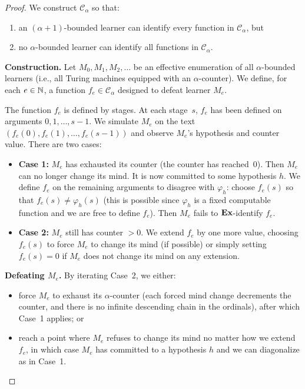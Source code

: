 \begin{proof}
We construct $\mathcal{C}_\alpha$ so that:
\begin{enumerate}[label=(\roman*)]
\item an $(\alpha+1)$-bounded learner can identify every function
  in $\mathcal{C}_\alpha$, but
\item no $\alpha$-bounded learner can identify all functions in
  $\mathcal{C}_\alpha$.
\end{enumerate}

\textbf{Construction.}
Let $M_0, M_1, M_2, \ldots$ be an effective enumeration of all
$\alpha$-bounded learners (i.e., all Turing machines equipped with
an $\alpha$-counter).  We define, for each $e \in \mathbb{N}$, a function
$f_e \in \mathcal{C}_\alpha$ designed to defeat learner $M_e$.

The function $f_e$ is defined by stages.  At each stage~$s$, $f_e$ has
been defined on arguments $0, 1, \ldots, s-1$.  We simulate $M_e$ on
the text $(f_e(0), f_e(1), \ldots, f_e(s-1))$ and observe $M_e$'s
hypothesis and counter value.  There are two cases:

\begin{itemize}[leftmargin=*]
\item \textbf{Case 1:} $M_e$ has exhausted its counter (the counter has
  reached~$0$).  Then $M_e$ can no longer change its mind.  It is now
  committed to some hypothesis $h$.  We define $f_e$ on the remaining
  arguments to disagree with $\varphi_h$: choose $f_e(s)$ so that
  $f_e(s) \neq \varphi_h(s)$ (this is possible since $\varphi_h$ is a
  fixed computable function and we are free to define $f_e$).  Then
  $M_e$ fails to $\mathbf{Ex}$-identify $f_e$.

\item \textbf{Case 2:} $M_e$ still has counter $> 0$.  We extend $f_e$
  by one more value, choosing $f_e(s)$ to force $M_e$ to change its mind
  (if possible) or simply setting $f_e(s) = 0$ if $M_e$ does not change
  its mind on any extension.
\end{itemize}

\textbf{Defeating $M_e$.}
By iterating Case~2, we either:
\begin{itemize}[leftmargin=*]
\item force $M_e$ to exhaust its $\alpha$-counter (each forced mind
  change decrements the counter, and there is no infinite descending
  chain in the ordinals), after which Case~1 applies; or
\item reach a point where $M_e$ refuses to change its mind no matter
  how we extend $f_e$, in which case $M_e$ has committed to a
  hypothesis $h$ and we can diagonalize as in Case~1.
\end{itemize}


\end{proof}
